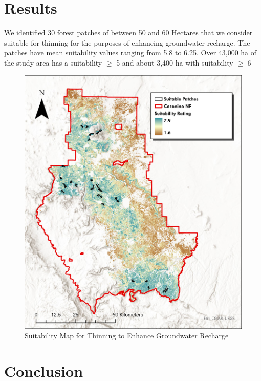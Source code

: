 \documentclass[
  number]{elsarticle}
\begin{document}
\section{Results}\label{results}

We identified 30 forest patches of between 50 and 60 Hectares that we
consider suitable for thinning for the purposes of enhancing groundwater
recharge. The patches have mean suitability values ranging from 5.8 to
6.25. Over 43,000 ha of the study area has a suitability \(\geq\) 5 and
about 3,400 ha with suitability \(\geq\) 6

\begin{figure}[H]

{\centering \includegraphics{images/Thinning_Suitability_Map.jpg}

}

\caption{Suitability Map for Thinning to Enhance Groundwater Recharge}

\end{figure}%

\section{Conclusion}\label{conclusion}
\end{document}
